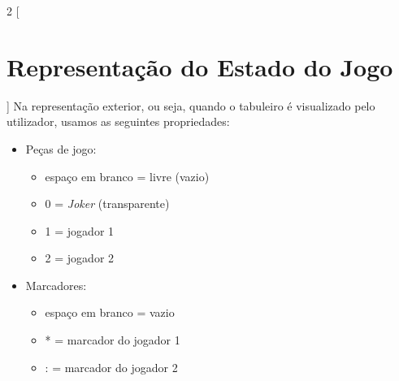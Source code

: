 \documentclass[a4paper]{article}
\begin{document}






\begin{multicols}{2}
	[\section{Representação do Estado do Jogo\newline}]
Na representação exterior, ou seja, quando o tabuleiro é visualizado pelo utilizador, usamos as seguintes propriedades:
\begin{itemize}
	\item Peças de jogo:
		\begin{itemize}
			\item espaço em branco = livre (vazio)
			\item 0 = \textit{Joker} (transparente)
			\item 1 = jogador 1
			\item 2	= jogador 2
		\end{itemize}
	\item Marcadores:
		\begin{itemize}
			\item espaço em branco = vazio
			\item * = marcador do jogador 1
			\item : = marcador do jogador 2
		\end{itemize}
\end{itemize}

\columnbreak


\end{multicols}
\end{document}
